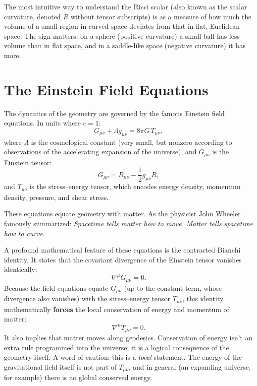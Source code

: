 The most intuitive way to understand the Ricci scalar (also known as the scalar curvature, denoted $R$ without tensor subscripts) 
is as a measure of how much the volume of a small region in curved space deviates from that in flat, Euclidean space.
The sign matters: on a sphere (positive curvature) a small ball has less volume than in flat space, and in a saddle-like space (negative curvature) it has more.


\section*{The Einstein Field Equations}

The dynamics of the geometry are governed by the famous Einstein field equations. In units where $c=1$:
\begin{equation}
G_{\mu\nu} + \Lambda g_{\mu\nu} = 8\pi G \, T_{\mu\nu},
\end{equation}
where $\Lambda$ is the cosmological constant (very small, but nonzero according to observations of the accelerating expansion of the universe), and $G_{\mu\nu}$ is the Einstein tensor:
\begin{equation}
G_{\mu\nu} = R_{\mu\nu} - \frac{1}{2} g_{\mu\nu} R,
\end{equation}
and $T_{\mu\nu}$ is the stress--energy tensor, which encodes energy density, momentum density, pressure, and shear stress.

These equations equate geometry with matter.
As the physicist John Wheeler famously summarized: \emph{Spacetime tells matter how to move. Matter tells spacetime how to curve.}

A profound mathematical feature of these equations is the contracted Bianchi identity.
It states that the covariant divergence of the Einstein tensor vanishes identically:
\begin{equation}
\nabla^\mu G_{\mu\nu} = 0.
\end{equation}
Because the field equations equate $G_{\mu\nu}$ (up to the constant term, whose divergence also vanishes) with the stress--energy tensor $T_{\mu\nu}$, this identity mathematically \textbf{forces} the local conservation of energy and momentum of matter:
\begin{equation}
\nabla^\mu T_{\mu\nu} = 0.
\end{equation}
It also implies that matter moves along geodesics.
Conservation of energy isn't an extra rule programmed into the universe; it is a logical consequence of the geometry itself.
A word of caution: this is a \emph{local} statement.
The energy of the gravitational field itself is not part of $T_{\mu\nu}$, and in general (an expanding universe, for example) there is no global conserved energy.

